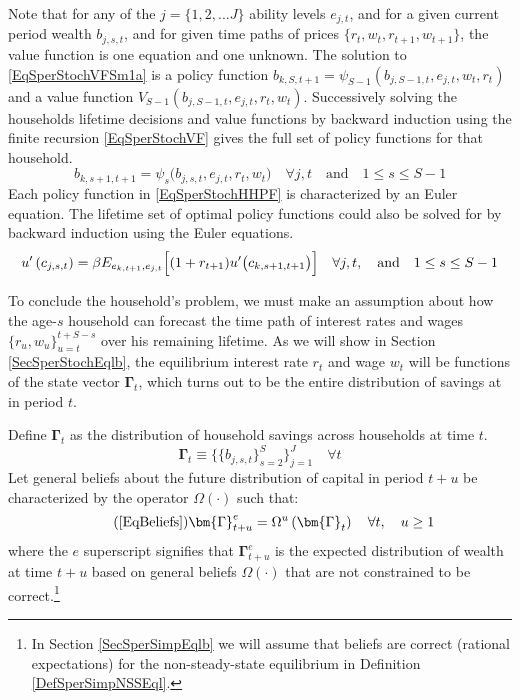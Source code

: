 \documentclass[letterpaper,12pt]{article}
\theoremstyle{definition}
\numberwithin{equation}{section}
\numberwithin{exercise}{section}
\begin{document}
\begin{spacing}{1.5}
      Note that for any of the $j=\{1,2,...J\}$ ability levels $e_{j,t}$, and for a given current period wealth $b_{j,s,t}$, and for given time paths of prices $\{r_t,w_t,r_{t+1},w_{t+1}\}$, the value function is one equation and one unknown. The solution to \eqref{EqSperStochVFSm1a} is a policy function $b_{k,S,t+1}=\psi_{S-1}\left(b_{j,S-1,t},e_{j,t},w_t,r_t\right)$ and a value function $V_{S-1}\left(b_{j,S-1,t},e_{j,t},r_t,w_t\right)$. Successively solving the households lifetime decisions and value functions by backward induction using the finite recursion \eqref{EqSperStochVF} gives the full set of policy functions for that household.
      \begin{equation}\label{EqSperStochHHPF}
         b_{k,s+1,t+1} = \psi_s\bigl(b_{j,s,t},e_{j,t},r_t,w_t\bigr) \quad\forall j,t \quad\text{and}\quad 1\leq s\leq S-1
      \end{equation}
      Each policy function in \eqref{EqSperStochHHPF} is characterized by an Euler equation. The lifetime set of optimal policy functions could also be solved for by backward induction using the Euler equations.
      \begin{equation}\label{EqSperStochEulGen}
         u'\left(c_{j,s,t}\right) = \beta E_{e_{k,t+1},e_{j,t}}\Bigl[(1 + r_{t+1})u'\bigl(c_{k,s+1,t+1}\bigr)\Bigr] \quad\forall j,t,\quad\text{and}\quad 1\leq s\leq S-1
      \end{equation}

      To conclude the household's problem, we must make an assumption about how the age-$s$ household can forecast the time path of interest rates and wages $\{r_u, w_u\}_{u=t}^{t+S-s}$ over his remaining lifetime. As we will show in Section \ref{SecSperStochEqlb}, the equilibrium interest rate $r_t$ and wage $w_t$ will be functions of the state vector $\bm{\Gamma}_t$, which turns out to be the entire distribution of savings at in period $t$.

      Define $\bm{\Gamma}_t$ as the distribution of household savings across households at time $t$.
      \begin{equation}\label{EqSperStochsavDist}
         \bm{\Gamma}_t \equiv \bigl\{\{b_{j,s,t}\}_{s=2}^S\bigr\}_{j=1}^J \quad\forall t
      \end{equation}
      Let general beliefs about the future distribution of capital in period $t+u$ be characterized by the operator $\Omega(\cdot)$ such that:
      \begin{equation}\tag{\ref{EqBeliefs}}
         \bm{\Gamma}^e_{t+u} = \Omega^u\left(\bm{\Gamma}_t\right) \quad \forall t, \quad u\geq 1
      \end{equation}
      where the $e$ superscript signifies that $\bm{\Gamma}^e_{t+u}$ is the expected distribution of wealth at time $t+u$ based on general beliefs $\Omega(\cdot)$ that are not constrained to be correct.\footnote{In Section \ref{SecSperSimpEqlb} we will assume that beliefs are correct (rational expectations) for the non-steady-state equilibrium in Definition \ref{DefSperSimpNSSEql}.}



\end{spacing}
\end{document}
